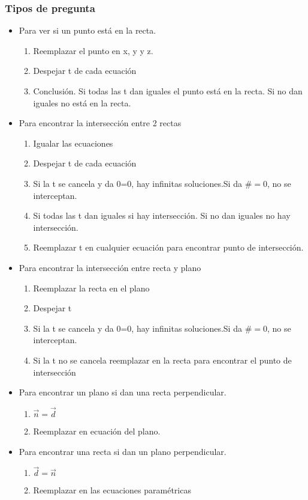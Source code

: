 \subsubsection{Tipos de pregunta}
\begin{itemize}
	\item Para ver si un punto está en la recta.
	\begin{enumerate}
		\item Reemplazar el punto en x, y y z.
		\item Despejar t de cada ecuación
		\item Conclusión. Si todas las t dan iguales el punto está en la recta. Si no dan iguales no está en la recta.
	\end{enumerate}
	\item Para encontrar la intersección entre 2 rectas
	\begin{enumerate}
		\item Igualar las ecuaciones
		\item Despejar t de cada ecuación
		\item Si la t se cancela y da 0=0, hay infinitas soluciones.Si da $\#=0$, no se interceptan.
		\item Si todas las t dan iguales si hay intersección. Si no dan iguales no hay intersección.
		\item Reemplazar t en cualquier ecuación para encontrar punto de intersección.
	\end{enumerate}
	\item Para encontrar la intersección entre recta y plano
	\begin{enumerate}
		\item Reemplazar la recta en el plano
		\item Despejar t
		\item Si la t se cancela y da 0=0, hay infinitas soluciones.Si da $\#=0$, no se interceptan.
		\item Si la t no se cancela reemplazar en la recta para encontrar el punto de intersección
	\end{enumerate}
	\item Para encontrar un plano si dan una recta perpendicular.
	\begin{enumerate}
		\item $\overrightarrow{n}=\overrightarrow{d}$
		\item Reemplazar en ecuación del plano.
	\end{enumerate}
	\item Para encontrar una recta si dan un plano perpendicular.
	\begin{enumerate}
		\item $\overrightarrow{d}=\overrightarrow{n}$
		\item Reemplazar en las ecuaciones paramétricas
	\end{enumerate}
	

\end{itemize}
